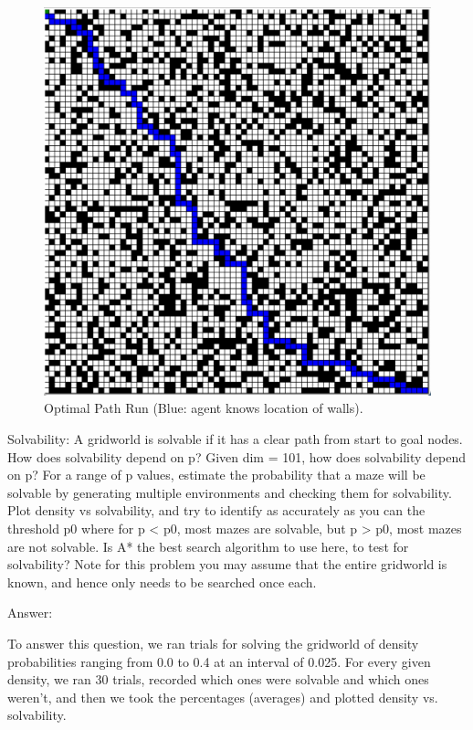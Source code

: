 \documentclass{homeworg}
\begin{document}
\begin{figure}[h]
  	\centering
  	\includegraphics*[scale=0.3]{Optimal1.jpeg}
	\caption{Optimal Path Run (Blue: agent knows location of walls).}
	\label{fig:example}
\end{figure}
 
\newpage
\exercise*
Solvability: A gridworld is solvable if it has a clear path from start to goal nodes. How does solvability depend on p? Given dim = 101, how does solvability depend on p? For a range of p values, estimate the probability that a maze will be solvable by generating multiple environments and checking them for solvability. Plot density vs solvability, and try to identify as accurately as you can the threshold p0 where for p < p0, most mazes are solvable, but p > p0, most mazes are not solvable. Is A* the best search algorithm to use here, to test for solvability? Note for this problem you may assume that the entire gridworld is known, and hence only needs to be searched once each.

Answer:

To answer this question, we ran trials for solving the gridworld of density probabilities ranging from 0.0 to 0.4 at an interval of 0.025. For every given density, we ran 30 trials, recorded which ones were solvable and which ones weren’t, and then we took the percentages (averages) and plotted density vs. solvability.
\end{document}
